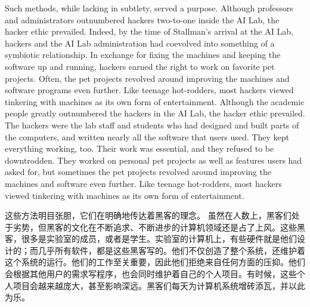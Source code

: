 \ifdefined\eng
\ifdefined\vone
Such methods, while lacking in subtlety, served a purpose. Although professors and administrators outnumbered hackers two-to-one inside the AI Lab, the hacker ethic prevailed. Indeed, by the time of Stallman's arrival at the AI Lab, hackers and the AI Lab administration had coevolved into something of a symbiotic relationship. In exchange for fixing the machines and keeping the software up and running, hackers earned the right to work on favorite pet projects. Often, the pet projects revolved around improving the machines and software programs even further. Like teenage hot-rodders, most hackers viewed tinkering with machines as its own form of entertainment.
\fi
\ifdefined\vtwo
Although the academic people greatly outnumbered the hackers in the AI Lab, the hacker ethic prevailed. The hackers were the lab staff and students who had designed and built parts of the computers, and written nearly all the software that users used.  They kept everything working, too.  Their work was essential, and they refused to be downtrodden.  They worked on personal pet projects as well as features users had asked for, but sometimes the pet projects revolved around improving the machines and software even further. Like teenage hot-rodders, most hackers viewed tinkering with machines as its own form of entertainment.
\fi

\ifdefined\chs
\ifdefined\vone
这些方法明目张胆，它们在明确地传达着黑客的理念。
\fi
虽然在人数上，黑客们处于劣势，但黑客的文化在不断追求、不断进步的计算机领域还是占了上风。这些黑客，很多是实验室的成员，或者是学生。实验室的计算机上，有些硬件就是他们设计的；而几乎所有软件，都是这些黑客写的。他们不仅创造了整个系统，还维护着这个系统的运行。他们的工作至关重要，因此他们拒绝来自任何方面的压抑。他们会根据其他用户的需求写程序，也会同时维护着自己的个人项目。有时候，这些个人项目会越来越庞大，甚至影响深远。黑客们每天为计算机系统增砖添瓦，并以此为乐。
\fi


